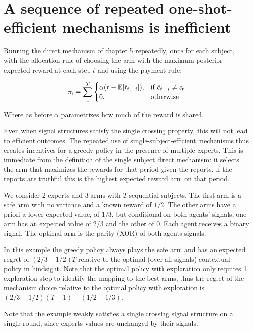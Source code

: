 \section{A sequence of repeated one-shot-efficient mechanisms is inefficient}

Running the direct mechanism of chapter 5 repeatedly, once for each subject, with the allocation rule of choosing the arm with the maximum posterior expected reward at each step $t$ and using the payment rule:

\[
    \pi_i = \sum_1^T 
\begin{cases}
    \alpha (r - \operatorname*{\mathbb E}[\hat{r}_{t,-i}]) ,& \text{if } \hat{c}_{t,-i} \neq c_t\\
    0,              & \text{otherwise}
\end{cases}
\]

Where as before $\alpha$ parametrizes how much of the reward is shared. 

Even when signal structures satisfy the single crossing property, this will not lead to efficient outcomes.
The repeated use of single-subject-efficient mechanisms thus creates incentives for a greedy policy in the presence of multiple experts.
This is immediate from the definition of the single subject direct mechanism: it selects the arm that maximizes the rewards for that period given the reports. If the reports are truthful this is the highest expected reward arm on that period.


\begin{eg}\label{eg:2regimes}
We consider 2 experts and 3 arms with $T$ sequential subjects. The first arm is a safe arm with no variance and a known reward of $1/2$. The other arms have a priori a lower expected value, of $1/3$, but conditional on both agents' signals, one arm has an expected value of $2/3$ and the other of $0$. 
Each agent receives a binary signal. The optimal arm is the parity (XOR) of both agents signals. 
\end{eg}

In this example the greedy policy always plays the safe arm and has an expected regret of $(2/3 - 1/2)T$ relative to the optimal (over all signals) contextual policy in hindsight.
Note that the optimal policy with exploration only requires 1 exploration step to identify the mapping to the best arms, thus the regret of the mechanism choice  relative to the optimal policy with exploration is $(2/3 - 1/2)(T-1) - (1/2-1/3)$. 

Note that the example weakly satisfies a single crossing signal structure on a single round, since experts values are unchanged by their signals.

